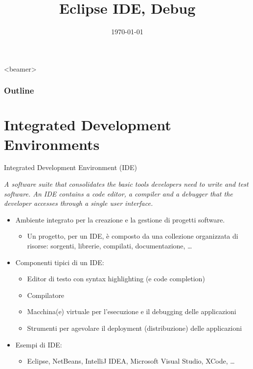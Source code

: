 \documentclass[presentation]{beamer}
\title[{\lab} -- Eclipse, Debug]{Eclipse IDE, Debug}
\date[\today]{\today}
\begin{document}
	
\frame[label=coverpage]{\titlepage}

\begin{frame}<beamer>
	\frametitle{Outline}
	\tableofcontents[]
\end{frame}

\section{Integrated Development Environments}

\begin{frame}{Integrated Development Environment (IDE)}
	\begin{block}{}
		\emph{A software suite that consolidates the basic tools developers need to write and test software. An IDE contains a code editor, a compiler and a debugger that the developer accesses through a single user interface.}
	\end{block}
	\begin{itemize}
		\item Ambiente integrato per la creazione e la gestione di progetti software.
		\begin{itemize}
			\item Un progetto, per un IDE, è composto da una collezione organizzata di risorse: sorgenti, librerie, compilati, documentazione, \dots
		\end{itemize}
		\item Componenti tipici di un IDE:
		\begin{itemize}
			\item Editor di testo con syntax highlighting (e code completion)
			\item Compilatore
			\item Macchina(e) virtuale per l'esecuzione e il debugging delle applicazioni
			\item Strumenti per agevolare il deployment (distribuzione) delle applicazioni
		\end{itemize}
		\item Esempi di IDE:
		\begin{itemize}
			\item Eclipse, NetBeans, IntelliJ IDEA, Microsoft Visual Studio, XCode, \dots
		\end{itemize}
	\end{itemize}
\end{frame}
\end{document}
